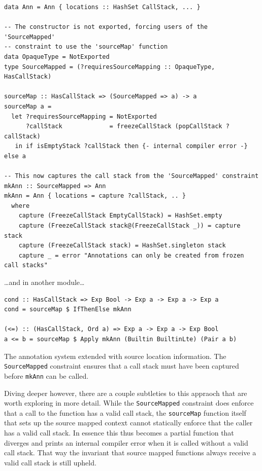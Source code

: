 \documentclass[fontsize=11pt,a4paper,parskip=half,numbers=noenddot]{scrartcl}
\newcommand{\hask}[1]{\texttt{#1}}
\begin{document}
\begin{listing}[!ht]
\begin{verbatim}
data Ann = Ann { locations :: HashSet CallStack, ... }

-- The constructor is not exported, forcing users of the 'SourceMapped'
-- constraint to use the 'sourceMap' function
data OpaqueType = NotExported
type SourceMapped = (?requiresSourceMapping :: OpaqueType, HasCallStack)

sourceMap :: HasCallStack => (SourceMapped => a) -> a
sourceMap a =
  let ?requiresSourceMapping = NotExported
      ?callStack             = freezeCallStack (popCallStack ?callStack)
   in if isEmptyStack ?callStack then {- internal compiler error -} else a

-- This now captures the call stack from the 'SourceMapped' constraint
mkAnn :: SourceMapped => Ann
mkAnn = Ann { locations = capture ?callStack, .. }
  where
    capture (FreezeCallStack EmptyCallStack) = HashSet.empty
    capture (FreezeCallStack stack@(FreezeCallStack _)) = capture stack
    capture (FreezeCallStack stack) = HashSet.singleton stack
    capture _ = error "Annotations can only be created from frozen call stacks"
\end{verbatim}

\dots{}and in another module\dots

\begin{verbatim}
cond :: HasCallStack => Exp Bool -> Exp a -> Exp a -> Exp a
cond = sourceMap $ IfThenElse mkAnn

(<=) :: (HasCallStack, Ord a) => Exp a -> Exp a -> Exp Bool
a <= b = sourceMap $ Apply mkAnn (Builtin BuiltinLte) (Pair a b)
\end{verbatim}
\caption{The annotation system extended with source location information. The \hask{SourceMapped} constraint ensures that a call stack must have been captured before \hask{mkAnn} can be called.}\label{src:ann-sourcemapped}
\end{listing}

Diving deeper however, there are a couple subtleties to this appraoch that are
worth exploring in more detail. While the \hask{SourceMapped} constraint does
enforce that a call to the function has a valid call stack, the \hask{sourceMap}
function itself that sets up the source mapped context cannot statically enforce
that the caller has a valid call stack. In essence this thus becomes a partial
function that diverges and prints an internal compiler error when it is called
without a valid call stack. That way the invariant that source mapped functions
always receive a valid call stack is still upheld.
\end{document}
